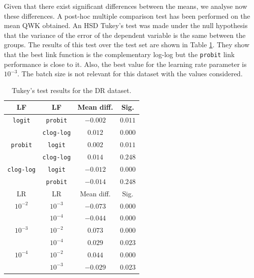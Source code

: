 \documentclass[journal]{IEEEtran}
\begin{document}
	Given that there exist significant differences between the means, we analyse now these differences. A post-hoc multiple comparison test has been performed on the mean QWK obtained. An HSD Tukey's test \cite{tukey1949comparing} was made under the null hypothesis that the variance of the error of the dependent variable is the same between the groups. The results of this test over the test set are shown in Table \ref{table:TukeyDR}. They show that the best link function is the complementary log-log but the \texttt{probit} link performance is close to it. Also, the best value for the learning rate parameter is $10^{-3}$. The batch size is not relevant for this dataset with the values considered.
		
	\begin{table}[!t]
		\caption{Tukey's test results for the DR dataset.}
		\label{table:TukeyDR}
		\centering
		\begin{tabular}{cccc}
			\hline\hline
			       LF         &        LF         & Mean diff. &  Sig.   \\ \hline
			 \texttt{logit}   &  \texttt{probit}  &  $-0.002$  & $0.011$ \\
			                  & \texttt{clog-log} &  $0.012$   & $0.000$ \\
			 \texttt{probit}  &  \texttt{logit}   &  $0.002$   & $0.011$ \\
			                  & \texttt{clog-log} &  $0.014$   & $0.248$ \\
			\texttt{clog-log} &  \texttt{logit}   &  $-0.012$  & $0.000$ \\
			                  &  \texttt{probit}  &  $-0.014$  & $0.248$ \\ \hline\hline
			       LR         &        LR         & Mean diff. &  Sig.   \\ \hline
			    $10^{-2}$     &     $10^{-3}$     &  $-0.073$  & $0.000$ \\
			                  &     $10^{-4}$     &  $-0.044$  & $0.000$ \\
			    $10^{-3}$     &     $10^{-2}$     &  $0.073$   & $0.000$ \\
			                  &     $10^{-4}$     &  $0.029$   & $0.023$ \\
			    $10^{-4}$     &     $10^{-2}$     &  $0.044$   & $0.000$ \\
			                  &     $10^{-3}$     &  $-0.029$  & $0.023$ \\ \hline\hline
		\end{tabular}
	\end{table}
	
\end{document}
